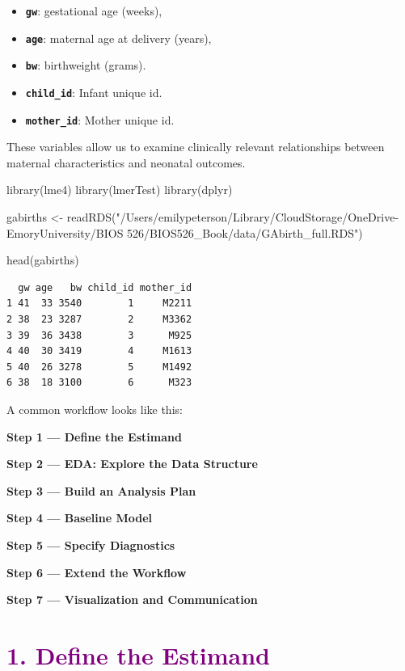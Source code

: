 \documentclass[
  letterpaper,
  DIV=11,
  numbers=noendperiod]{scrreprt}
\newenvironment{Shaded}{\begin{snugshade}}{\end{snugshade}}
\newcommand{\FunctionTok}[1]{\textcolor[rgb]{0.28,0.35,0.67}{#1}}
\newcommand{\NormalTok}[1]{\textcolor[rgb]{0.00,0.23,0.31}{#1}}
\newcommand{\OtherTok}[1]{\textcolor[rgb]{0.00,0.23,0.31}{#1}}
\newcommand{\StringTok}[1]{\textcolor[rgb]{0.13,0.47,0.30}{#1}}
\begin{document}
\begin{itemize}
\item
  \textbf{\texttt{gw}}: gestational age (weeks),
\item
  \textbf{\texttt{age}}: maternal age at delivery (years),
\item
  \textbf{\texttt{bw}}: birthweight (grams).
\item
  \textbf{\texttt{child\_id}}: Infant unique id.
\item
  \textbf{\texttt{mother\_id}}: Mother unique id.
\end{itemize}

These variables allow us to examine clinically relevant relationships
between maternal characteristics and neonatal outcomes.

\begin{Shaded}
\begin{Highlighting}[]
\FunctionTok{library}\NormalTok{(lme4)}
\FunctionTok{library}\NormalTok{(lmerTest)}
\FunctionTok{library}\NormalTok{(dplyr)}

\NormalTok{gabirths }\OtherTok{\textless{}{-}} \FunctionTok{readRDS}\NormalTok{(}\StringTok{"/Users/emilypeterson/Library/CloudStorage/OneDrive{-}EmoryUniversity/BIOS 526/BIOS526\_Book/data/GAbirth\_full.RDS"}\NormalTok{)}

\FunctionTok{head}\NormalTok{(gabirths)}
\end{Highlighting}
\end{Shaded}

\begin{verbatim}
  gw age   bw child_id mother_id
1 41  33 3540        1     M2211
2 38  23 3287        2     M3362
3 39  36 3438        3      M925
4 40  30 3419        4     M1613
5 40  26 3278        5     M1492
6 38  18 3100        6      M323
\end{verbatim}

A common workflow looks like this:

\textbf{Step 1 --- Define the Estimand}

\textbf{Step 2 --- EDA: Explore the Data Structure}

\textbf{Step 3 --- Build an Analysis Plan}

\textbf{Step 4 --- Baseline Model}

\textbf{Step 5 --- Specify Diagnostics}

\textbf{Step 6 --- Extend the Workflow}

\textbf{Step 7 --- Visualization and Communication}

\hypertarget{section-49}{%
\section*{\texorpdfstring{\textcolor{purple}{1. Define the Estimand}}{}}\label{section-49}}
\end{document}

